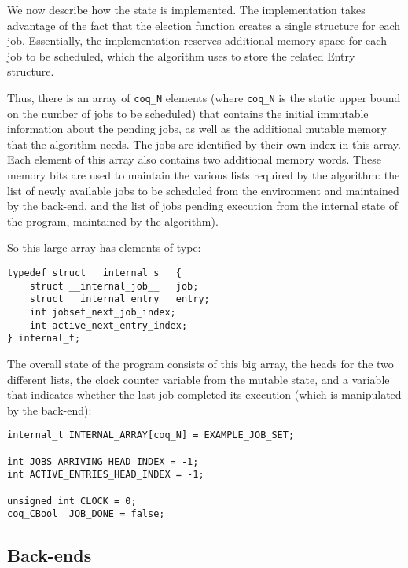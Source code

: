 	We now describe how the state is implemented.
	The implementation takes advantage of the fact that the election function creates a single structure for each job. Essentially, the implementation reserves additional memory space for each job to be scheduled, which the algorithm uses to store the related Entry structure.

	Thus, there is an array of \texttt{coq\_N} elements (where \texttt{coq\_N} is the static upper bound on the number of jobs to be scheduled) that contains the initial immutable information about the pending jobs, as well as the additional mutable memory that the algorithm needs. The jobs are identified by their own index in this array. Each element of this array also contains two additional memory words. These memory bits are used to maintain the various lists required by the algorithm: the list of newly available jobs to be scheduled from the environment and maintained by the back-end, and the list of jobs pending execution from the internal state of the program, maintained by the algorithm).

	So this large array has elements of type:
	\begin{verbatim}
typedef struct __internal_s__ {
    struct __internal_job__   job;
    struct __internal_entry__ entry;
    int jobset_next_job_index;
    int active_next_entry_index;
} internal_t;
	\end{verbatim}

	The overall state of the program consists of this big array, the heads for the two different lists, the clock counter variable from the mutable state, and a variable that indicates whether the last job completed its execution (which is manipulated by the back-end):

	\begin{verbatim}
internal_t INTERNAL_ARRAY[coq_N] = EXAMPLE_JOB_SET;

int JOBS_ARRIVING_HEAD_INDEX = -1;
int ACTIVE_ENTRIES_HEAD_INDEX = -1;

unsigned int CLOCK = 0;
coq_CBool  JOB_DONE = false;
	\end{verbatim}

	\subsection{Back-ends}
	\label{sec:back-ends}

